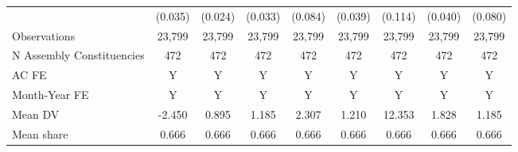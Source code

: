 {\begin{tabular}{l*{8}{c}}
            &     (0.035)         &     (0.024)         &     (0.033)         &     (0.084)         &     (0.039)         &     (0.114)         &     (0.040)         &     (0.080)         \\
Observations&      23,799         &      23,799         &      23,799         &      23,799         &      23,799         &      23,799         &      23,799         &      23,799         \\
N Assembly Constituencies&         472         &         472         &         472         &         472         &         472         &         472         &         472         &         472         \\
AC FE       &           Y         &           Y         &           Y         &           Y         &           Y         &           Y         &           Y         &           Y         \\
Month-Year FE&           Y         &           Y         &           Y         &           Y         &           Y         &           Y         &           Y         &           Y         \\
Mean DV     &      -2.450         &       0.895         &       1.185         &       2.307         &       1.210         &      12.353         &       1.828         &       1.185         \\
Mean share  &       0.666         &       0.666         &       0.666         &       0.666         &       0.666         &       0.666         &       0.666         &       0.666         \\
\bottomrule
\end{tabular}
}
